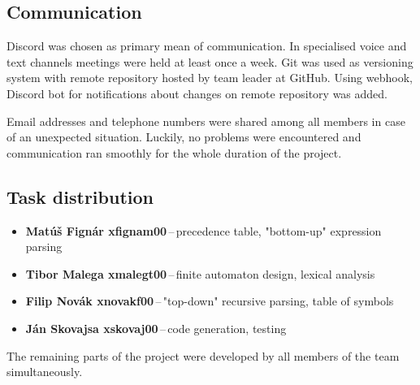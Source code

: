 \documentclass[a4paper, 11pt]{article}
\begin{document}
\subsection{Communication}\label{sec:COMM}
Discord was chosen as primary mean of communication. In specialised voice and text channels meetings were
held at least once a week. Git was used as versioning system with remote repository hosted by team leader at
GitHub. Using webhook, Discord bot for notifications about changes on remote repository was added.\par
Email addresses and telephone numbers were shared among all members in case of an unexpected situation.
Luckily, no problems were encountered and communication ran smoothly for the whole duration of the project.

\subsection{Task distribution}\label{sec:TASKS}
\begin{itemize}

    \item \textbf{Matúš Fignár xfignam00}\,--\,precedence table, "bottom-up" expression parsing
    \item \textbf{Tibor Malega xmalegt00}\,--\,finite automaton design, lexical analysis
    \item \textbf{Filip Novák xnovakf00}\,--\,"top-down" recursive parsing, table of symbols
    \item \textbf{Ján Skovajsa xskovaj00}\,--\,code generation, testing

\end{itemize}
The remaining parts of the project were developed by all members of the team simultaneously.














\newpage
\end{document}
